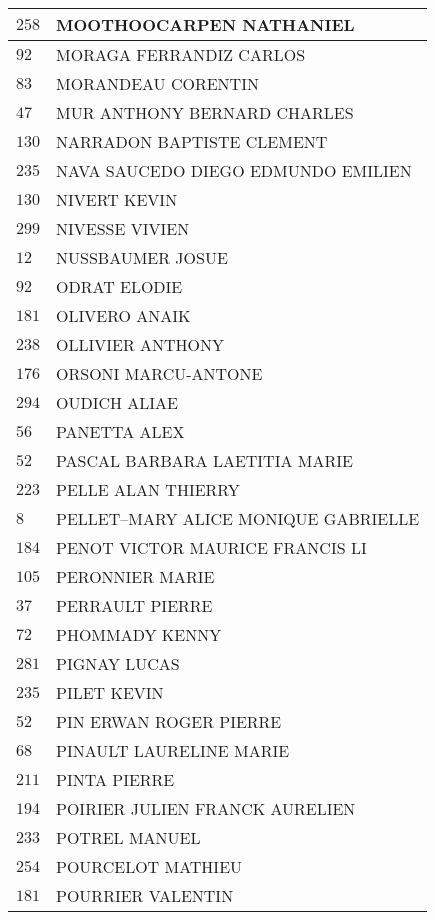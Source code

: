 \begin{xltabular}{\linewidth}{|l|X|}
    \hline
    $258$ & MOOTHOOCARPEN NATHANIEL \\
    \hline
    $92$ & MORAGA FERRANDIZ CARLOS \\
    \hline
    $83$ & MORANDEAU CORENTIN \\
    \hline
    $47$ & MUR ANTHONY BERNARD CHARLES \\
    \hline
    $130$ & NARRADON BAPTISTE CLEMENT \\
    \hline
    $235$ & NAVA SAUCEDO DIEGO EDMUNDO EMILIEN \\
    \hline
    $130$ & NIVERT KEVIN \\
    \hline
    $299$ & NIVESSE VIVIEN \\
    \hline
    $12$ & NUSSBAUMER JOSUE \\
    \hline
    $92$ & ODRAT ELODIE \\
    \hline
    $181$ & OLIVERO ANAIK \\
    \hline
    $238$ & OLLIVIER ANTHONY \\
    \hline
    $176$ & ORSONI MARCU-ANTONE \\
    \hline
    $294$ & OUDICH ALIAE \\
    \hline
    $56$ & PANETTA ALEX \\
    \hline
    $52$ & PASCAL BARBARA LAETITIA MARIE \\
    \hline
    $223$ & PELLE ALAN THIERRY \\
    \hline
    $8$ & PELLET--MARY ALICE MONIQUE GABRIELLE \\
    \hline
    $184$ & PENOT VICTOR MAURICE FRANCIS LI \\
    \hline
    $105$ & PERONNIER MARIE \\
    \hline
    $37$ & PERRAULT PIERRE \\
    \hline
    $72$ & PHOMMADY KENNY \\
    \hline
    $281$ & PIGNAY LUCAS \\
    \hline
    $235$ & PILET KEVIN \\
    \hline
    $52$ & PIN ERWAN ROGER PIERRE \\
    \hline
    $68$ & PINAULT LAURELINE MARIE \\
    \hline
    $211$ & PINTA PIERRE \\
    \hline
    $194$ & POIRIER JULIEN FRANCK AURELIEN \\
    \hline
    $233$ & POTREL MANUEL \\
    \hline
    $254$ & POURCELOT MATHIEU \\
    \hline
    $181$ & POURRIER VALENTIN \\

\end{xltabular}
